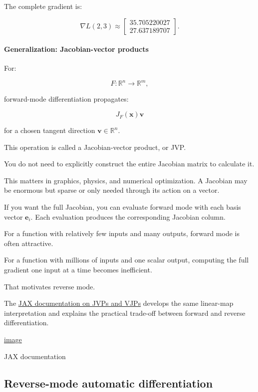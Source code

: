 The complete gradient is:

\[
\boxed{ \nabla L(2,3) \approx \begin{bmatrix} 35.705220027\\ 27.637189707 \end{bmatrix} }.
\]

\paragraph{Generalization: Jacobian-vector products}\label{02-foundations-ii-ch022-generalization-jacobian-vector-products}

For:

\[
F:\mathbb R^n\rightarrow\mathbb R^m,
\]

forward-mode differentiation propagates:

\[
\boxed{ J_F(\mathbf x)\mathbf v }
\]

for a chosen tangent direction \(\mathbf v\in\mathbb R^n\).

This operation is called a Jacobian-vector product, or JVP.

You do not need to explicitly construct the entire Jacobian matrix to calculate it.

This matters in graphics, physics, and numerical optimization. A Jacobian may be enormous but sparse or only needed through its action on a vector.

If you want the full Jacobian, you can evaluate forward mode with each basis vector \(\mathbf e_i\). Each evaluation produces the corresponding Jacobian column.

For a function with relatively few inputs and many outputs, forward mode is often attractive.

For a function with millions of inputs and one scalar output, computing the full gradient one input at a time becomes inefficient.

That motivates reverse mode.

The \href{https://docs.jax.dev/en/latest/jacobian-vector-products.html?utm_source=chatgpt.com}{JAX documentation on JVPs and VJPs} develops the same linear-map interpretation and explains the practical trade-off between forward and reverse differentiation. 

\href{https://www.google.com/s2/favicons?domain=https://docs.jax.dev&sz=32}{image}

JAX documentation

\subsection{Reverse-mode automatic differentiation}\label{02-foundations-ii-ch022-reverse-mode-automatic-differentiation}

